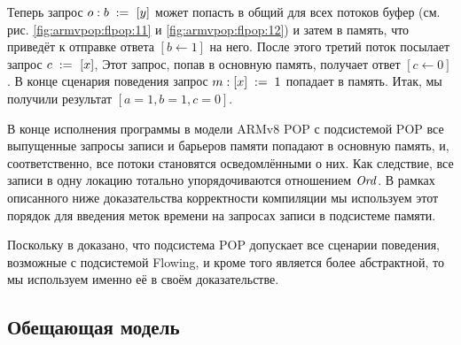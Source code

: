 Теперь запрос $o: b \;:=_{}\;[y]$ может попасть в общий для всех потоков буфер
(см. рис. \ref{fig:armvpop:flpop:11} и \ref{fig:armvpop:flpop:12}) и затем в память, что
приведёт к отправке ответа $[b \leftarrow 1]$ на него.
После этого третий поток посылает запрос $c \;:=_{}\;[x]$,
Этот запрос, попав в основную память, получает ответ $[c \leftarrow 0]$.
В конце сценария поведения запрос $m : [x]\;:=\;1$ попадает в память.
Итак, мы получили результат $[a = 1, b = 1, c = 0]$.

В конце исполнения программы в модели ARMv8 POP с подсистемой POP все выпущенные запросы записи и барьеров
памяти попадают в основную память, и, соответственно, все потоки становятся осведомлёнными о них.
Как следствие, все записи в одну локацию тотально упорядочиваются отношением $\mathit{Ord}$.
В рамках описанного ниже доказательства корректности компиляции мы используем этот порядок для введения меток времени
на запросах записи в подсистеме памяти.

Поскольку в \cite{Flur-al:POPL16} доказано, что подсистема POP допускает все сценарии поведения, возможные с подсистемой Flowing,
и кроме того является более абстрактной, то мы используем именно её в своём доказательстве.

\subsection{Обещающая модель}


